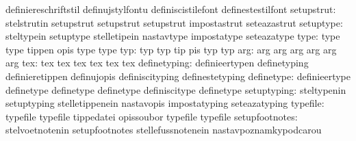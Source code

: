                                   definiereschriftstil             definujstylfontu
                                  definiscistilefont               definestestilfont
                      setupstrut: stelstrutin                      setupstrut
                                  setupstrut                       setupstrut
                                  impostastrut                     seteazastrut
                       setuptype: steltypein                       setuptype
                                  stelletipein                     nastavtype
                                  impostatype                      seteazatype
                            type: type                             type
                                  tippen                           opis
                                  type                             type
                             typ: typ                              typ
                                  tip                              pis
                                  typ                              typ
                             arg: arg                              arg
                                  arg                              arg
                                  arg                              arg
                             tex: tex                              tex
                                  tex                              tex
                                  tex                              tex
                    definetyping: definieertypen                   definetyping
                                  definieretippen                  definujopis
                                  definiscityping                  definestetyping
                      definetype: definieertype                    definetype
                                  definetype                       definetype
                                  definiscitype                    definetype
                     setuptyping: steltypenin                      setuptyping
                                  stelletippenein                  nastavopis
                                  impostatyping                    seteazatyping
                        typefile: typefile                         typefile
                                  tippedatei                       opissoubor
                                  typefile                         typefile
                  setupfootnotes: stelvoetnotenin                  setupfootnotes
                                  stellefussnotenein               nastavpoznamkypodcarou
